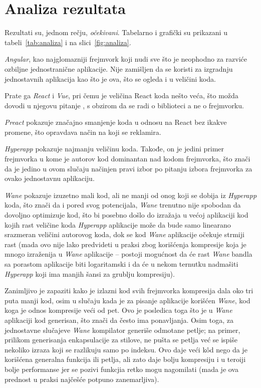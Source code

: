 \section{Analiza rezultata}
\label{sec:analiza}

Rezultati su, jednom rečju, \emph{očekivani}.
Tabelarno i grafički su prikazani u tabeli~\ref{tab:analiza} i na slici~\ref{fig:analiza}.

\textsl{Angular}, kao najglomazniji frejmvork koji nudi sve što je neophodno za razviće ozbiljne jednostranične aplikacije.
Nije zamišljen da se koristi za izgradnju jednostavnih aplikacija kao što je ova, što se ogleda i u veličini koda.

Prate ga \textsl{React} i \textsl{Vue}, pri čemu je veličina React koda nešto veća, što možda dovodi u njegovu pitanje , s obzirom da se radi o biblioteci a ne o frejmvorku.

\textsl{Preact} pokazuje značajno smanjenje koda u odnosu na React bez ikakve promene, što opravdava način na koji se reklamira.

\textsl{Hyperapp} pokazuje najmanju veličinu koda.
Takođe, on je jedini primer frejmvorka u kome je autorov kod dominantan nad kodom frejmvorka, što znači da je jedino u ovom slučaju načinjen pravi izbor po pitanju izbora frejmvorka za ovako jednostavnu aplikaciju.

\textsl{Wane} pokazuje izuzetno mali kod, ali ne manji od onog koji se dobija iz \textsl{Hyperapp} koda, što znači da i pored svog potencijala, \textsl{Wane} trenutno nije spobodan da dovoljno optimizuje kod, što bi posebno došlo do izražaja u većoj aplikaciji kod kojih rast veličine koda \textsl{Hyperapp} aplikacije može da bude samo linearano srazmeran veličini autorovog koda, dok se kod \textsl{Wane} aplikacije očekuje strmiji rast (mada ovo nije lako predvideti u praksi zbog korišćenja kompresije koja je mnogo izraženija u \textsl{Wane} aplikacije -- postoji mogućnost da će rast \textsl{Wane} bandla sa porastom aplikacije biti logaritamski i da će u nekom ternutku nadmašiti \textsl{Hyperapp} koji ima manjih šansi za grublju kompresiju).

Zanimljivo je zapaziti kako je izlazni kod svih frejmvorka kompresija dala oko tri puta manji kod, osim u slučaju kada je za pisanje aplikacije korišćen \textsl{Wane}, kod koga je odnos kompresije veći od pet.
Ovo je posledica toga što je u \textsl{Wane} aplikaciji kod generisan, što znači da često ima ponavljanja.
Osim toga, za jednostavne slučajeve \textsl{Wane} kompilator generiše odmotane petlje; na primer, prilikom generisanja enkapsulacije za stilove, ne pušta se petlja već se ispiše nekoliko izraza koji se razlikuju samo po indeksu.
Ovo daje veći kôd nego da je korišćena generalna funkcija ili  petlja, ali zato daje bolju kompresiju i u teroiji bolje performanse jer se pozivi funkcjia retko mogu nagomilati (mada je ova prednost u praksi najčešće potpuno zanemarljiva).

